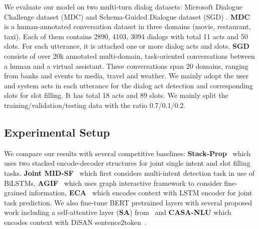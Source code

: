 \documentclass[a4paper]{article}
\begin{document}
We evaluate our model on two multi-turn dialog datasets: Microsoft Dialogue Challenge dataset (MDC) \cite{li2018microsoft} and Schema-Guided Dialogue dataset (SGD) \cite{rastogi2019towards}. \textbf{MDC} is a human-annotated conversation dataset in three domains (movie, restaurant, taxi). Each of them contains 2890, 4103, 3094 dialogs with total 11 acts and 50 slots. For each utterance, it is attached one or more dialog acts and slots. \textbf{SGD} consists of over 20k annotated multi-domain, task-oriented conversations between a human and a virtual assistant. These conversations span 20 domains, ranging from banks and events to media, travel and weather. We mainly adopt the user and system acts in each utterance for the dialog act detection and corresponding slots for slot filling. It has total 18 acts and 89 slots. We mainly split the training/validation/testing data with the ratio 0.7/0.1/0.2. 


\subsection{Experimental Setup}


We compare our results with several competitive baselines:
\textbf{Stack-Prop}~\cite{qin2019stackpropagation} which uses two stacked encode-decoder structures for joint single intent and slot filling tasks. \textbf{Joint MID-SF}~\cite{Rash:19} which first considers multi-intent detection task in use of BiLSTMs, \textbf{AGIF}~\cite{qin2020agif} which uses graph interactive framework to consider fine-grained information, \textbf{ECA}~\cite{chauhan20} which encodes context with LSTM encoder for joint task prediction. We also fine-tune BERT pretrained layers with several proposed work including a self-attentive layer (\textbf{SA}) from~\cite{lin2017structured} and \textbf{CASA-NLU} which encodes context with DiSAN sentence2token~\cite{gupta2019casanlu}.
\end{document}
